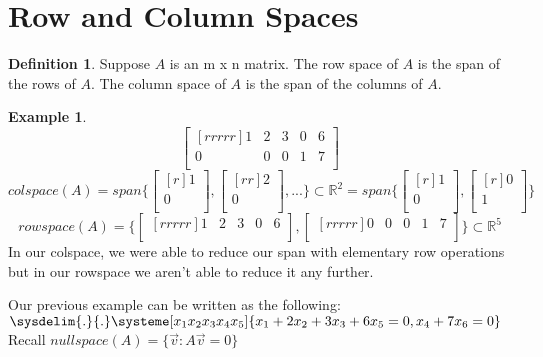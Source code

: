 \documentclass{report}
\theoremstyle{plain}
\theoremstyle{definition}
\newtheorem*{ex}{Example}
\newtheorem*{defn}{Definition}
\theoremstyle{plain}
\begin{document}
\section{Row and Column Spaces}
\begin{defn}
Suppose $A$ is an m x n matrix. The row space of $A$ is the span of the rows of $A$. The column space of $A$ is the span of the columns of $A$.
\end{defn}
\begin{ex}
\[ \begin{bmatrix}[rrrrr] 1 & 2 & 3 & 0 & 6\\ 0 & 0 & 0 & 1 & 7\\ \end{bmatrix} \]
\[ colspace(A) = span\{\begin{bmatrix}[r]1\\0\\ \end{bmatrix}, \begin{bmatrix}[rr]2\\0\\ \end{bmatrix}, ...\} \subset \mathbb{R}^2 = span\{\begin{bmatrix}[r]1\\0\\ \end{bmatrix}, \begin{bmatrix}[r]0\\1\\ \end{bmatrix} \} \]
\[ rowspace(A) = \{\begin{bmatrix}[rrrrr]1&2&3&0&6\\ \end{bmatrix},\begin{bmatrix}[rrrrr]0&0&0&1&7\\ \end{bmatrix}\} \subset \mathbb{R}^5 \]
In our colspace, we were able to reduce our span with elementary row operations but in our rowspace we aren't able to reduce it any further.
\end{ex}
Our previous example can be written as the following: $\sysdelim{.}{.}\systeme[x_1x_2x_3x_4x_5]{x_1+2x_2+3x_3+6x_5=0,x_4+7x_6=0}$\\
Recall $nullspace(A)=\{\vec{v}: A\vec{v} = 0\}$\\
\end{document}
